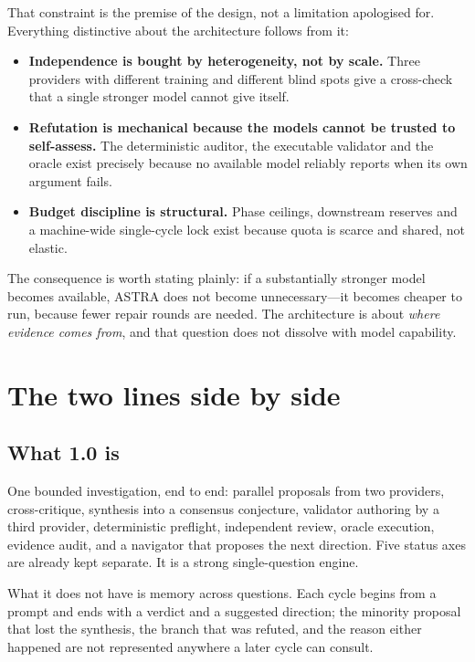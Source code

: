 \documentclass[11pt,a4paper]{article}
\begin{document}
That constraint is the premise of the design, not a limitation apologised for.
Everything distinctive about the architecture follows from it:

\begin{itemize}[leftmargin=*,itemsep=1pt]
  \item \textbf{Independence is bought by heterogeneity, not by scale.} Three
        providers with different training and different blind spots give a
        cross-check that a single stronger model cannot give itself.
  \item \textbf{Refutation is mechanical because the models cannot be trusted to
        self-assess.} The deterministic auditor, the executable validator and
        the oracle exist precisely because no available model reliably reports
        when its own argument fails.
  \item \textbf{Budget discipline is structural.} Phase ceilings, downstream
        reserves and a machine-wide single-cycle lock exist because quota is
        scarce and shared, not elastic.
\end{itemize}

The consequence is worth stating plainly: if a substantially stronger model
becomes available, ASTRA does not become unnecessary---it becomes cheaper to
run, because fewer repair rounds are needed. The architecture is about
\emph{where evidence comes from}, and that question does not dissolve with
model capability.

\section{The two lines side by side}

\subsection{What 1.0 is}

One bounded investigation, end to end: parallel proposals from two providers,
cross-critique, synthesis into a consensus conjecture, validator authoring by a
third provider, deterministic preflight, independent review, oracle execution,
evidence audit, and a navigator that proposes the next direction. Five status
axes are already kept separate. It is a strong single-question engine.

What it does not have is memory across questions. Each cycle begins from a
prompt and ends with a verdict and a suggested direction; the minority proposal
that lost the synthesis, the branch that was refuted, and the reason either
happened are not represented anywhere a later cycle can consult.
\end{document}
